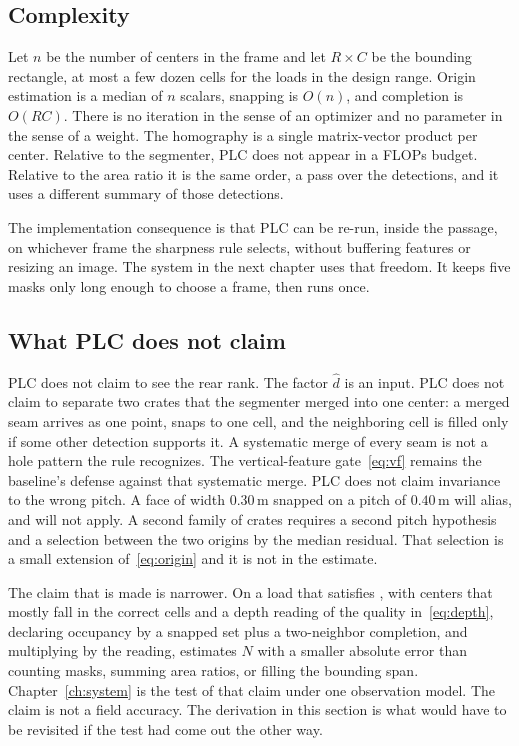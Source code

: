 \subsection{Complexity}
\label{sec:plc-complexity}

Let $n$ be the number of centers in the frame and let $R\times C$ be the bounding rectangle, at most a few dozen cells for the loads in the design range. Origin estimation is a median of $n$ scalars, snapping is $O(n)$, and completion is $O(RC)$. There is no iteration in the sense of an optimizer and no parameter in the sense of a weight. The homography is a single matrix-vector product per center. Relative to the segmenter, PLC does not appear in a FLOPs budget. Relative to the area ratio it is the same order, a pass over the detections, and it uses a different summary of those detections.

The implementation consequence is that PLC can be re-run, inside the passage, on whichever frame the sharpness rule selects, without buffering features or resizing an image. The system in the next chapter uses that freedom. It keeps five masks only long enough to choose a frame, then runs  once.

\subsection{What PLC does not claim}
\label{sec:plc-claims}

PLC does not claim to see the rear rank. The factor $\hat{d}$ is an input. PLC does not claim to separate two crates that the segmenter merged into one center: a merged seam arrives as one point, snaps to one cell, and the neighboring cell is filled only if some other detection supports it. A systematic merge of every seam is not a hole pattern the rule recognizes. The vertical-feature gate~\eqref{eq:vf} remains the baseline's defense against that systematic merge. PLC does not claim invariance to the wrong pitch. A face of width $0.30\,\mathrm{m}$ snapped on a pitch of $0.40\,\mathrm{m}$ will alias, and  will not apply. A second family of crates requires a second pitch hypothesis and a selection between the two origins by the median residual. That selection is a small extension of~\eqref{eq:origin} and it is not in the estimate.

The claim that is made is narrower. On a load that satisfies , with centers that mostly fall in the correct cells and a depth reading of the quality in~\eqref{eq:depth}, declaring occupancy by a snapped set plus a two-neighbor completion, and multiplying by the reading, estimates $N$ with a smaller absolute error than counting masks, summing area ratios, or filling the bounding span. Chapter~\ref{ch:system} is the test of that claim under one observation model. The claim is not a field accuracy. The derivation in this section is what would have to be revisited if the test had come out the other way.

